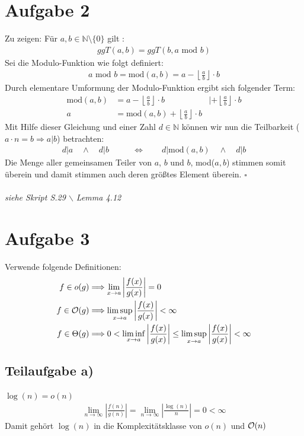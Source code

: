 \documentclass{llncs}
\begin{document}
\section*{Aufgabe 2}
Zu zeigen:
Für $a,b \in \mathbb{N}\setminus\{0\} $ gilt :
\begin{align*}
ggT(a,b) = ggT(b, a\text{ mod } b)
\end{align*}
Sei die Modulo-Funktion wie folgt definiert:
\begin{align*}
a \text{ mod }b =\text{mod}(a,b) = a-\left\lfloor \frac{a}{b} \right\rfloor \cdot b
\end{align*}
Durch elementare Umformung der Modulo-Funktion ergibt sich folgender Term:
\begin{align*}
\text{mod}(a,b) &= a-\left\lfloor \frac{a}{b} \right\rfloor \cdot b &| +\left\lfloor \frac{a}{b} \right\rfloor \cdot b\\
a &=\text{mod}(a,b) +\left\lfloor \frac{a}{b} \right\rfloor \cdot b
\end{align*}
Mit Hilfe dieser Gleichung und einer Zahl $d \in \mathbb{N}$ können wir nun die Teilbarkeit ($a \cdot n = b \Rightarrow a | b  $) betrachten:
\begin{align*}
d|a \quad \wedge \quad  d|b \quad\quad 
&\Longleftrightarrow \quad\quad d| \text{mod}(a,b) \quad \wedge\quad  d|b
\end{align*}
Die Menge aller gemeinsamen Teiler von $a$, $b$ und $b$, mod($a,b$) stimmen somit überein und damit stimmen auch deren größtes Element überein.  \hfill $\square$\\\\
\textit{siehe Skript S.29 $\backslash$ Lemma 4.12}
\newpage

\section*{Aufgabe 3}
Verwende folgende Definitionen:
\begin{align*}
f \in o(g) &\Longrightarrow \lim_{x \to a}{\left|\frac{f(x)}{g(x)}\right|}=0\\
f \in \mathcal{O}(g) &\Longrightarrow \limsup_{x \to a}{\left|\frac{f(x)}{g(x)}\right|}<\infty\\
f \in \Theta(g) &\Longrightarrow 0<\liminf_{x \to a}{\left|\frac{f(x)}{g(x)}\right|} \le \limsup_{x \to a}{\left|\frac{f(x)}{g(x)}\right|}<\infty
\end{align*}
\subsection*{Teilaufgabe a)}
$\log(n) = o(n)$
\begin{align*}
\lim_{n \to \infty}{\left|\frac{f(n)}{g(n)}\right|}=\lim_{n \to \infty}{\left|\frac{\log(n)}{n}\right|}=0 < \infty
\end{align*}
Damit gehört $\log(n)$ in die Komplexitätsklasse von $o(n)$ und $\mathcal{O}(n)$
\end{document}
